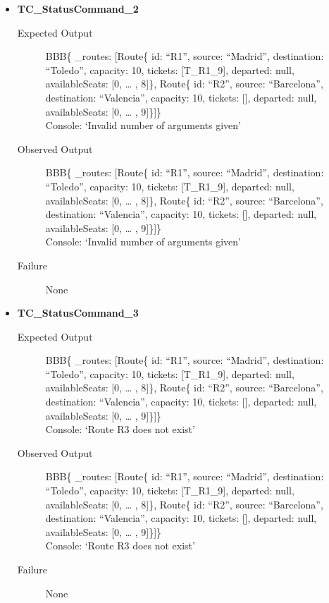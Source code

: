 \documentclass[11pt]{article}
\begin{document}
\begin{itemize}
\item \textbf{TC\_StatusCommand\_2}
\begin{description}
\item[{Expected Output}] BBB\{ \_routes: [Route\{ id: “R1”, source: “Madrid”, destination: “Toledo”, capacity: 10,  tickets: [T\_R1\_9], departed: null, availableSeats: [0, … , 8]\}, Route\{ id: “R2”, source: “Barcelona”, destination: “Valencia”, capacity: 10,  tickets: [], departed: null, availableSeats: [0, … , 9]\}]\}\\
Console: ‘Invalid number of arguments given’
\item[{Observed Output}] BBB\{ \_routes: [Route\{ id: “R1”, source: “Madrid”, destination: “Toledo”, capacity: 10,  tickets: [T\_R1\_9], departed: null, availableSeats: [0, … , 8]\}, Route\{ id: “R2”, source: “Barcelona”, destination: “Valencia”, capacity: 10,  tickets: [], departed: null, availableSeats: [0, … , 9]\}]\}\\
Console: ‘Invalid number of arguments given’
\item[{Failure}] None
\end{description}

\item \textbf{TC\_StatusCommand\_3}
\begin{description}
\item[{Expected Output}] BBB\{ \_routes: [Route\{ id: “R1”, source: “Madrid”, destination: “Toledo”, capacity: 10,  tickets: [T\_R1\_9], departed: null, availableSeats: [0, … , 8]\}, Route\{ id: “R2”, source: “Barcelona”, destination: “Valencia”, capacity: 10,  tickets: [], departed: null, availableSeats: [0, … , 9]\}]\}\\
Console: ‘Route R3 does not exist’
\item[{Observed Output}] BBB\{ \_routes: [Route\{ id: “R1”, source: “Madrid”, destination: “Toledo”, capacity: 10,  tickets: [T\_R1\_9], departed: null, availableSeats: [0, … , 8]\}, Route\{ id: “R2”, source: “Barcelona”, destination: “Valencia”, capacity: 10,  tickets: [], departed: null, availableSeats: [0, … , 9]\}]\}\\
Console: ‘Route R3 does not exist’
\item[{Failure}] None
\end{description}


\end{itemize}
\end{document}
